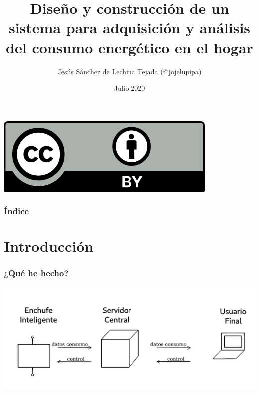 \documentclass[compress, aspectratio=169]{beamer} %
\title[smart-plug]{Diseño y construcción de un sistema para adquisición y análisis del consumo energético en el hogar} %
\author[Jesús Sánchez de Lechina Tejada]{
	Jesús Sánchez de Lechina Tejada
	(\href{http://www.github.com/jojelupipa}{@jojelupipa})\\ 
} %
\institute[UGR] %
{
  Universidad de Granada \\ %
}
\date{Julio 2020} %
\begin{document}
\begin{frame}
	\transdissolve[duration=1]

	\titlepage %
        \centering \includegraphics[scale=0.3]{img/by.png}
\end{frame}


 
\begin{frame}
  \transdissolve[duration=1]
  \tableofcontents[]
  \frametitle{Índice}
\end{frame}


\section{Introducción}
	\begin{frame}
	  \transdissolve[duration=1]
	  \frametitle{\insertsection}
	\end{frame}

        \begin{frame}
          \transdissolve[duration=1]
          \frametitle{¿Qué he hecho?}

          \includegraphics{img/esquema_basico_sistema.png}
          
          
        \end{frame}
\end{document}
